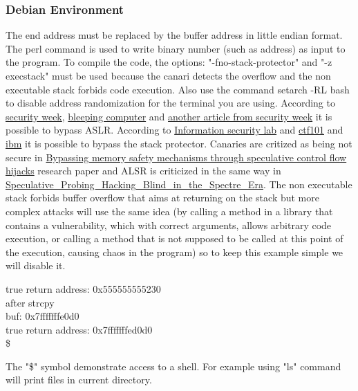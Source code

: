 \documentclass[a4paper, 11pt]{article}
\begin{document}
	\subsubsection{Debian Environment}
The end address must be replaced by the buffer address in little endian format.
The perl command is used to write binary number (such as address) as input to the program.
To compile the code, the options: "-fno-stack-protector" and "-z execstack" must be used because the canari detects the overflow and the non executable stack forbids code execution.
Also use the command setarch -RL bash to disable address randomization for the terminal you are using.
According to \href{https://www.securityweek.com/aslr-bypass-techniques-appearing-more-frequently-attacks/}{security week}, \href{https://www.bleepingcomputer.com/news/security/cisa-warns-of-samsung-aslr-bypass-flaw-exploited-in-attacks/}{bleeping computer} and \href{https://www.securityweek.com/aslr-bypass-techniques-appearing-more-frequently-attacks/}{another article from security week} it is possible to bypass ASLR.
According to \href{https://tc.gts3.org/cs6265/2020-spring/tut/tut04-ssp.html}{Information security lab} and \href{https://ctf101.org/binary-exploitation/stack-canaries/}{ctf101} and \href{https://ibm.github.io/system-security-research-updates/2021/06/18/spear-attacks-ssp-usecase}{ibm} it is possible to bypass the stack protector.
Canaries are critized as being not secure in \href{https://ar5iv.labs.arxiv.org/html/2003.05503}{Bypassing memory safety mechanisms through speculative control flow hijacks} research paper and ALSR is criticized in the same way in \href{https://www.researchgate.net/publication/346588673_Speculative_Probing_Hacking_Blind_in_the_Spectre_Era}{Speculative\_Probing\_Hacking\_Blind\_in\_the\_Spectre\_Era}.
The non executable stack forbids buffer overflow that aims at returning on the stack but more complex attacks will use the same idea (by calling a method in a library that contains a vulnerability, which with correct arguments, allows arbitrary code execution, or calling a method that is not supposed to be called at this point of the execution, causing chaos in the program) so to keep this example simple we will disable it.

\begin{tcolorbox}[colback=gray!5!white, colframe=gray!75!black, title=Output on classic \Gls{risc-v} environment (No CHERI protection)]
true return address: 0x555555555230\\
after strcpy\\
buf: 0x7fffffffe0d0\\
true return address: 0x7fffffffed0d0\\
\$ 
\end{tcolorbox}
The "\$" symbol demonstrate access to a shell. For example using "ls" command will print files in current directory.
\end{document}
